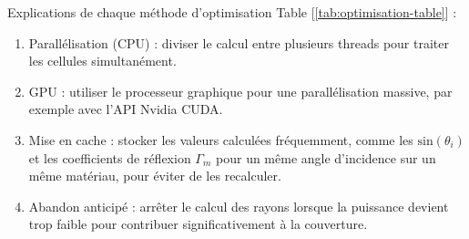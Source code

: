 Explications de chaque m{\'e}thode d'optimisation Table
[\ref{tab:optimisation-table}] :
\begin{enumerate}
  \item Parall{\'e}lisation (CPU) : diviser le calcul entre plusieurs threads
  pour traiter les cellules simultan{\'e}ment.
  
  \item GPU : utiliser le processeur graphique pour une parall{\'e}lisation
  massive, par exemple avec l'API Nvidia CUDA.
  
  \item Mise en cache : stocker les valeurs calcul{\'e}es fr{\'e}quemment,
  comme les $\mathrm{sin}(\theta_i)$ et les coefficients de r{\'e}flexion $\Gamma_m$ pour un même angle d'incidence sur un même matériau, pour {\'e}viter de les
  recalculer.
  
  \item Abandon anticip{\'e} : arr{\^e}ter le calcul des rayons lorsque la
  puissance devient trop faible pour contribuer significativement {\`a} la
  couverture.
\end{enumerate}